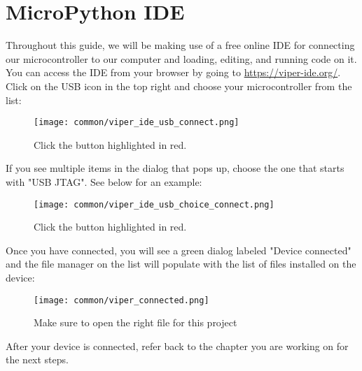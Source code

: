 \chapter{MicroPython IDE} \label{ide}

Throughout this guide, we will be making use of a free online IDE for connecting our microcontroller
to our computer and loading, editing, and running code on it. You can access the IDE from your browser
by going to \url{https://viper-ide.org/}. Click on the USB icon in the top right and choose your
microcontroller from the list:

\begin{figure}[H]
    \centering
    \texttt{[image: common/viper\_ide\_usb\_connect.png]}
    \caption{Click the button highlighted in red.}
\end{figure}

If you see multiple items in the dialog that pops up, choose the one that starts with "USB JTAG". See below for an example:
\begin{figure}[H]
    \centering
    \texttt{[image: common/viper\_ide\_usb\_choice\_connect.png]}
    \caption{Click the button highlighted in red.}
\end{figure}

Once you have connected, you will see a green dialog labeled "Device connected" and the file manager on the list
will populate with the list of files installed on the device:
\begin{figure}[H]
    \centering
    \texttt{[image: common/viper\_connected.png]}
    \caption{Make sure to open the right file for this project}
\end{figure}

After your device is connected, refer back to the chapter you are working on for the next steps.